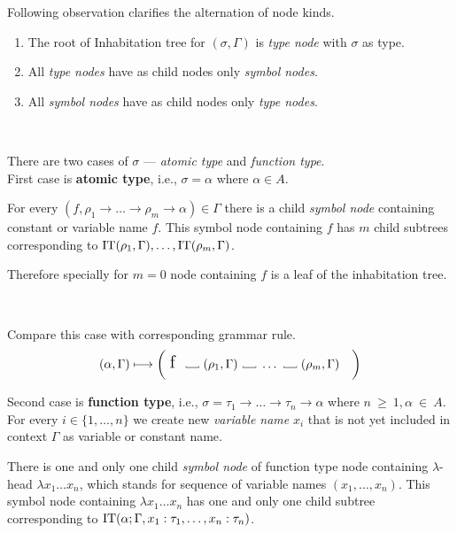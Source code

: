 \documentclass[12pt,a4paper]{report}
\newcommand\Vtextvisiblespace[1][.3em]{%
  \mbox{\kern.06em\vrule height.3ex}%
  \vbox{\hrule width#1}%
  \hbox{\vrule height.3ex}}
\begin{document}
Following observation clarifies the alternation of node kinds.
\begin{enumerate}
\item The root of Inhabitation tree for $(\sigma,\Gamma)$ is 
      \textit{type node} with $\sigma$ as type.
\item All \textit{type nodes} have as child nodes only \textit{symbol nodes}. 
\item All \textit{symbol nodes} have as child nodes only \textit{type nodes}. 
\end{enumerate}~



There are two cases of $\sigma$ --- 
\textit{atomic type} and \textit{function type}. \\

First case is \textbf{atomic type}, i.e., $\sigma = \alpha$ where $\alpha \in A$.

For every $(f,\rho_1 \rightarrow \dots \rightarrow \rho_m \rightarrow \alpha) \in \Gamma$
there is a child \textit{symbol node} containing constant or variable name $f$.
This symbol node containing $f$ has $m$ child subtrees corresponding to  
$\mathop{\mathrm{IT}}(\rho_1,\Gamma),\dots,\mathop{\mathrm{IT}}(\rho_m,\Gamma)$.  

Therefore specially for $m = 0$ node containing $f$ is 
a leaf of the inhabitation tree.

~

Compare this case with corresponding grammar rule.
\[ 
	( \alpha , \Gamma )  \gar
	\bigg( \mbox{ {\Large f }}
	  \mbox{ \Vtextvisiblespace[1em] } 
	  ( \rho_1 , \Gamma )
	  \mbox{ \Vtextvisiblespace[1em] } 
	  \dots
	  \mbox{ \Vtextvisiblespace[1em] } 
	  ( \rho_m , \Gamma )
	  \quad \bigg)
\]

Second case is \textbf{function type}, i.e., 
$\sigma = \tau_1 \rightarrow \dots \rightarrow \tau_n \rightarrow \alpha$
where $n~\geq~1, \alpha~\in~A$.\\
For every  $i \in \{1,\dots,n\}$ we create new \textit{variable name} $x_i$ 
that is not yet included in context $\Gamma$ as variable or constant name.
 
There is one and only one child \textit{symbol node} 
of function type node containing $\lambda$-head
$\lambda x_1 \dots x_n$, which stands for 
sequence of variable names $(x_1,\dots,x_n)$.
This symbol node containing $\lambda x_1 \dots x_n$
has one and only one child subtree corresponding to  
$\mathop{\mathrm{IT}}(\alpha;\Gamma,x_1:\tau_1 , \dots , x_n:\tau_n )$.   
\end{document}
